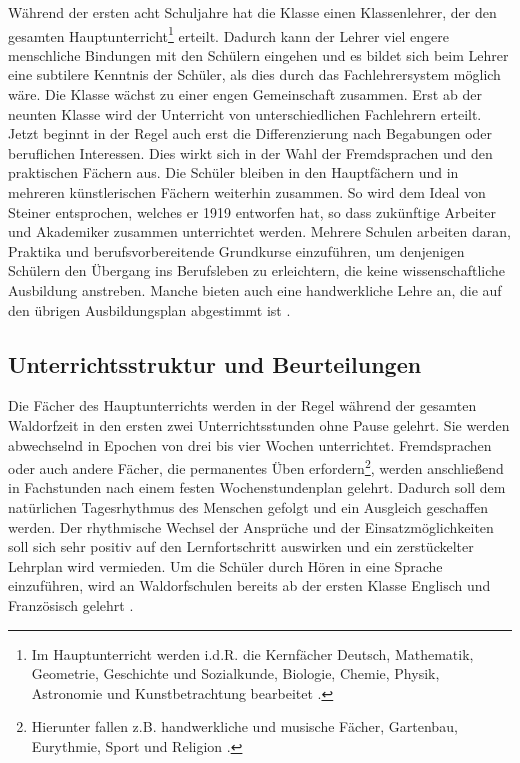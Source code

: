 Während der ersten acht Schuljahre hat die Klasse einen Klassenlehrer, der den gesamten Hauptunterricht\footnote{Im Hauptunterricht werden i.d.R. die Kernfächer Deutsch, Mathematik, Geometrie, Geschichte und Sozialkunde, Biologie, Chemie, Physik, Astronomie und Kunstbetrachtung bearbeitet \citep[vgl.][S. 50]{kiersch07}.} erteilt. Dadurch kann der Lehrer viel engere menschliche Bindungen mit den Schülern eingehen und es bildet sich beim Lehrer eine subtilere Kenntnis der Schüler, als dies durch das Fachlehrersystem möglich wäre. Die Klasse wächst zu einer engen Gemeinschaft zusammen. Erst ab der neunten Klasse wird der Unterricht von unterschiedlichen Fachlehrern erteilt. Jetzt beginnt in der Regel auch erst die Differenzierung nach Begabungen oder beruflichen Interessen. Dies wirkt sich in der Wahl der Fremdsprachen und den praktischen Fächern aus. Die Schüler bleiben in den Hauptfächern und in mehreren künstlerischen Fächern weiterhin zusammen. So wird dem Ideal von Steiner entsprochen, welches er 1919 entworfen hat, so dass zukünftige Arbeiter und Akademiker zusammen unterrichtet werden. Mehrere Schulen arbeiten daran, Praktika und berufsvorbereitende Grundkurse einzuführen, um denjenigen Schülern den Übergang ins Berufsleben zu erleichtern, die keine wissenschaftliche Ausbildung anstreben. Manche bieten auch eine handwerkliche Lehre an, die auf den übrigen Ausbildungsplan abgestimmt ist \citep[vgl.][]{kiersch07, hemleben63}.

\subsection{Unterrichtsstruktur und Beurteilungen} %
\label{sub:unterrichtsstruktur_und_Beurteilungen}
Die Fächer des Hauptunterrichts werden in der Regel während der gesamten Waldorfzeit in den ersten zwei Unterrichtsstunden ohne Pause gelehrt. Sie werden abwechselnd in Epochen von drei bis vier Wochen unterrichtet. Fremdsprachen oder auch andere Fächer, die permanentes Üben erfordern\footnote{Hierunter fallen z.B. handwerkliche und musische Fächer, Gartenbau, Eurythmie, Sport und Religion \citep[vgl.][]{waldorfschule13}.}, werden anschließend in Fachstunden nach einem festen Wochenstundenplan gelehrt. Dadurch soll dem natürlichen Tagesrhythmus des Menschen gefolgt und ein Ausgleich geschaffen werden. Der rhythmische Wechsel der Ansprüche und der Einsatzmöglichkeiten soll sich sehr positiv auf den Lernfortschritt auswirken und ein zerstückelter Lehrplan wird vermieden. Um die Schüler durch Hören in eine Sprache einzuführen, wird an Waldorfschulen bereits ab der ersten Klasse Englisch und Französisch gelehrt \citep[vgl.][]{kiersch07, hemleben63}.


